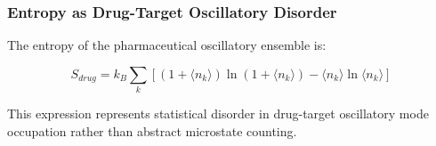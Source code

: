 \subsubsection{Entropy as Drug-Target Oscillatory Disorder}

The entropy of the pharmaceutical oscillatory ensemble is:

\begin{equation}
S_{drug} = k_B \sum_k \left[(1 + \langle n_k\rangle)\ln(1 + \langle n_k\rangle) - \langle n_k\rangle\ln\langle n_k\rangle\right]
\end{equation}

This expression represents statistical disorder in drug-target oscillatory mode occupation rather than abstract microstate counting.

